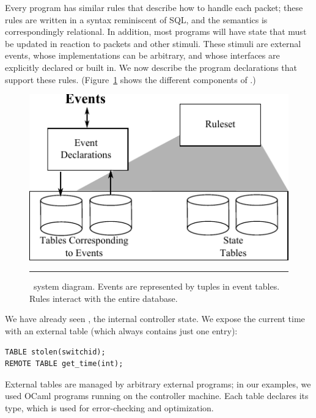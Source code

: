 Every program has similar rules that describe how to handle each packet;
these rules are written in a syntax reminiscent of SQL, and the semantics is
correspondingly relational. In addition, most programs will have state that
must be updated in reaction to packets and other stimuli.  These stimuli are
external events, whose implementations can be arbitrary, and whose interfaces
are explicitly declared or built in. We now describe the program declarations
that support these rules. (Figure~\ref{fig:events} shows the different
components of \flowlog.)

\begin{figure}
  \includegraphics[scale=0.95]{figs/events-and-db.pdf}
  \caption{\small \flowlog\ system diagram. Events are represented by tuples
  in event tables. Rules interact with the entire database.}
  \label{fig:events}
  \hrule
\end{figure}

We have already seen , 
the internal controller state.
We expose the current time with an
external table  (which always contains just one entry):
\noindent
\begin{minipage}{\linewidth}
\begin{lstlisting}[label=list:2]
TABLE stolen(switchid); 
REMOTE TABLE get_time(int); 
\end{lstlisting}
\end{minipage}
External tables are managed by arbitrary external programs; in our examples,
we used OCaml programs running on the controller machine. Each table
declares its type, which is used for error-checking and optimization.

